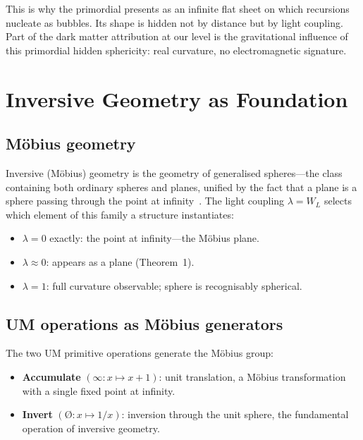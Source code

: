 \documentclass[prd,twocolumn,preprintnumbers,amsmath,amssymb]{revtex4-2}
\newcommand{\WL}{W_{L}}
\begin{document}
This is why the primordial presents as an infinite flat sheet on which recursions
nucleate as bubbles.  Its shape is hidden not by distance but by light coupling.
Part of the dark matter attribution at our level is the gravitational influence
of this primordial hidden sphericity: real curvature, no electromagnetic
signature.

\section{Inversive Geometry as Foundation}
\label{sec:mobius}

\subsection{Möbius geometry}

Inversive (Möbius) geometry is the geometry of generalised spheres---the class
containing both ordinary spheres and planes, unified by the fact that a plane
is a sphere passing through the point at infinity~\cite{Penrose2004}.  The
light coupling $\lambda = \WL$ selects which element of this family a structure
instantiates:
\begin{itemize}
  \item $\lambda = 0$ exactly: the point at infinity---the Möbius plane.
  \item $\lambda \approx 0$: appears as a plane (Theorem~1).
  \item $\lambda = 1$: full curvature observable; sphere is recognisably spherical.
\end{itemize}

\subsection{UM operations as Möbius generators}

The two UM primitive operations generate the Möbius group:
\begin{itemize}
  \item \textbf{Accumulate} $(\infty: x \mapsto x+1)$: unit translation, a
        Möbius transformation with a single fixed point at infinity.
  \item \textbf{Invert} $(\text{\O}: x \mapsto 1/x)$: inversion through the
        unit sphere, the fundamental operation of inversive geometry.
\end{itemize}
\end{document}
